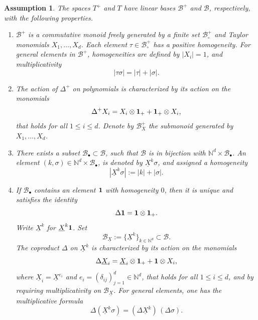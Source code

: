 \documentclass[10pt]{amsart}
\newcommand{\sbullet}{{\scriptscriptstyle\bullet}}
\theoremstyle{plain}
\newtheorem{assumption}{Assumption}
\theoremstyle{definition}
\newcommand{\bbN}{\mathbb{N}}
\newcommand{\mcB}{\mathcal{B}}
\begin{document}
\begin{assumption}\label{ass:A}
The spaces $T^+$ and $T$ have linear bases $\mcB^+$ and $\mcB$, respectively, with the following properties.
\begin{enumerate}
\item\label{ass:A1} $\mcB^+$ is a commutative monoid freely generated by a finite set $\mcB_\circ^+$ and Taylor monomials $X_1,\dots,X_d$.
Each element $\tau\in\mcB_\circ^+$ has a positive homogeneity. For general elements in $\mcB^+$, homogeneities are defined by $|X_i|=1$, and multiplicativity
\[
|\tau\sigma|=|\tau|+|\sigma|.
\]

\item\label{ass:A2} The action of $\Delta^+$ on polynomials is characterized by its action on the monomials
\begin{equation} \label{EqPreLeibniz}
\Delta^+X_i = X_i\otimes {\bf 1}_+ + {\bf 1}_+\otimes X_i,
\end{equation}
that holds for all $1\leq i\leq d$. Denote by $\mcB_X^+$ the submonoid generated by $X_1,\dots,X_d$.

\item\label{ass:A3} There exists a subset $\mcB_\sbullet\subset\mcB$, such that $\mcB$ is in bijection with $\bbN^d\times\mcB_\sbullet$. An element $(k,\sigma)\in\bbN^d\times\mcB_\sbullet$, is denoted by $\underline{X}^k\sigma$, and assigned a homogeneity
\[
|\underline{X}^k\sigma| := |k|+|\sigma|.
\]

\item\label{ass:A4} If $\mcB_\sbullet$ contains an element ${\bf 1}$ with homogeneity $0$, then it is unique and satisfies the identity
\[
\Delta{\bf 1} = {\bf 1}\otimes{\bf 1}_+.
\]
Write $\underline{X}^k$ for $\underline{X}^k{\bf1}$. Set
\[
\mcB_{\underline{X}} := \{\underline{X}^k\}_{k\in\bbN^d}\subset\mcB.
\]
The coproduct $\Delta$ on $\underline{X}^k$ is characterized by its action on the monomials
\[
\Delta \underline{X}_i = \underline{X}_i\otimes {\bf 1}_+ + {\bf 1}\otimes X_i,
\]
where $\underline{X}_i=\underline{X}^{e_i}$ and $e_i=(\delta_{ij})_{j=1}^d\in\bbN^d$, that holds for all $1\leq i\leq d$, and by requiring multiplicativity on $\mcB_{\underline{X}}$. For general elements, one has the multiplicative formula
\[
\Delta(\underline{X}^k\sigma) = (\Delta \underline{X}^k)\,(\Delta\sigma).
\]
\end{enumerate}
\end{assumption}
\end{document}
